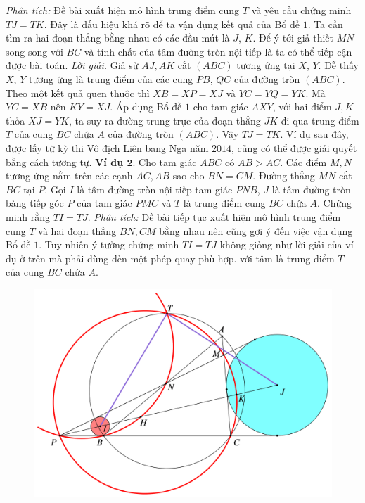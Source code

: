 \begin{multicols}{2}
	\textit{Phân tích:} Đề bài xuất hiện mô hình trung điểm cung $T$ và yêu cầu chứng minh $TJ=TK$. Đây là dấu hiệu khá rõ để ta vận dụng kết quả của Bổ đề $1$. Ta cần tìm ra hai đoạn thẳng bằng nhau có các đầu mút là $J$, $K$. Để ý tới giả thiết $MN$ song song với $BC$ và tính chất của tâm đường tròn nội tiếp là ta có thể tiếp cận được bài toán.
	\vskip 0.1cm
	\textit{Lời giải.} Giả sử $AJ,AK$ cắt $(ABC)$ tương ứng tại $X$, $Y$. Dễ thấy $X$, $Y$ tương ứng là trung điểm của các cung $PB$, $QC$ của đường tròn $(ABC)$. Theo một kết quả quen thuộc thì $XB=XP=XJ$ và  $YC=YQ=YK$. Mà $YC=XB$ nên $KY=XJ$. Áp dụng Bổ đề $1$ cho tam giác $AXY$, với hai điểm $J,K$ thỏa $XJ=YK$, ta suy ra đường trung trực của đoạn thẳng $JK$ đi qua trung điểm $T$ của cung $BC$ chứa $A$ của đường tròn $(ABC)$. Vậy $TJ=TK$.
	\vskip 0.1cm
	Ví dụ sau đây, được lấy từ kỳ thi Vô địch Liên bang Nga năm $2014$, cũng có thể được giải quyết bằng cách tương tự.
	\vskip 0.1cm
	\textbf{\color{hoccungpi}Ví dụ $\pmb{2.}$} Cho tam giác $ABC$ có $AB > AC$. Các điểm $M,N$ tương ứng nằm trên các cạnh $AC,AB$ sao cho $BN=CM$. Đường thẳng $MN$ cắt $BC$ tại $P$. Gọi $I$ là tâm đường tròn nội tiếp tam giác $PNB$, $J$ là tâm đường tròn bàng tiếp góc $P$ của tam giác $PMC$ và $T$ là trung điểm cung $BC$ chứa $A$. Chứng minh rằng  $TI=TJ$.
	\vskip 0.1cm
	\textit{Phân tích:} Đề bài tiếp tục xuất hiện mô hình trung điểm cung $T$ và hai đoạn thẳng $BN,CM$ bằng nhau nên cũng gợi ý đến việc vận dụng Bổ đề $1$. Tuy nhiên ý tưởng chứng minh $TI=TJ$ không giống như lời giải của ví dụ ở trên mà phải dùng đến một phép quay phù hợp. với tâm là trung điểm $T$ của cung $BC$ chứa $A$.
	\begin{figure}[H]
		\vspace*{-5pt}
		\centering
		\captionsetup{labelformat= empty, justification=centering}
		\includegraphics[width= 1\linewidth]{5}

\end{figure}
\end{multicols}
